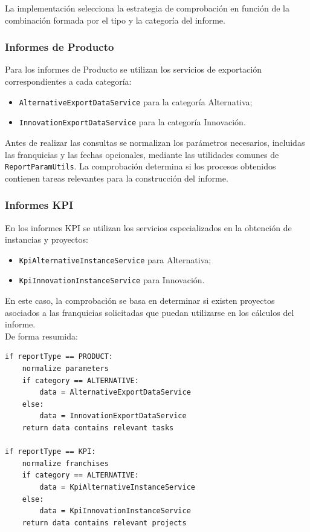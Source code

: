 \documentclass[11pt,a4paper,titlepage,oneside]{report}
\begin{document}
La implementación selecciona la estrategia de comprobación en función de la
combinación formada por el tipo y la categoría del informe.

\subsubsection{Informes de Producto}

Para los informes de Producto se utilizan los servicios de exportación
correspondientes a cada categoría:

\begin{itemize}

  \item \texttt{AlternativeExportDataService} para la categoría Alternativa;

  \item \texttt{InnovationExportDataService} para la categoría Innovación.

\end{itemize}

Antes de realizar las consultas se normalizan los parámetros necesarios,
incluidas las franquicias y las fechas opcionales, mediante las utilidades
comunes de \texttt{ReportParamUtils}. La comprobación determina si los
procesos obtenidos contienen tareas relevantes para la construcción del
informe.

\subsubsection{Informes KPI}

En los informes KPI se utilizan los servicios especializados en la obtención
de instancias y proyectos:

\begin{itemize}

  \item \texttt{KpiAlternativeInstanceService} para Alternativa;

  \item \texttt{KpiInnovationInstanceService} para Innovación.

\end{itemize}

En este caso, la comprobación se basa en determinar si existen proyectos
asociados a las franquicias solicitadas que puedan utilizarse en los cálculos
del informe. \\

De forma resumida:

\begin{lstlisting}[caption={Selección de la comprobación de disponibilidad de datos}]
if reportType == PRODUCT:
    normalize parameters
    if category == ALTERNATIVE:
        data = AlternativeExportDataService
    else:
        data = InnovationExportDataService
    return data contains relevant tasks

if reportType == KPI:
    normalize franchises
    if category == ALTERNATIVE:
        data = KpiAlternativeInstanceService
    else:
        data = KpiInnovationInstanceService
    return data contains relevant projects
\end{lstlisting}
\end{document}
